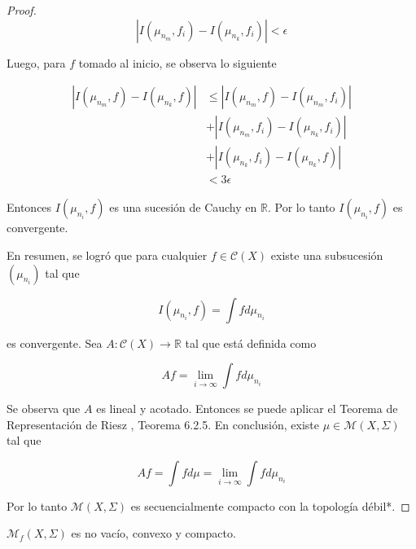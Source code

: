 \begin{proof}
	\begin{equation}
		|I(\mu_{n_m},f_i) - I(\mu_{n_k},f_i)| < \epsilon
	\end{equation}
	
	Luego, para $f$ tomado al inicio, se observa lo siguiente
	
	\begin{align}
		|I(\mu_{n_m},f) - I(\mu_{n_k},f)| &\leq |I(\mu_{n_m},f) - I(\mu_{n_m},f_i) | \\
		& + |I(\mu_{n_m},f_i) - I(\mu_{n_k},f_i)| \\		
		& + |I(\mu_{n_k},f_i) - I(\mu_{n_k},f)|\\
		& < 3\epsilon
	\end{align}
	
	Entonces $I(\mu_{n_i},f)$ es una sucesión de Cauchy en $\mathbb{R}$. Por lo tanto $I(\mu_{n_i},f)$ es convergente.
	
	En resumen, se logró que para cualquier $f \in \mathcal{C}(X)$ existe una subsucesión $(\mu_{n_i})$ tal que
	
	\begin{equation}
		I(\mu_{n_i},f) = \int f d\mu_{n_i}
	\end{equation}
	
	es convergente. Sea $A: \mathcal{C}(X) \rightarrow \mathbb{R}$ tal que está definida como
	
	\begin{equation}
		Af = \lim_{i \rightarrow \infty} \int f d \mu_{n_i}
	\end{equation}
	
	Se observa que $A$ es lineal y acotado. Entonces se puede aplicar el Teorema de Representación de Riesz \cite{riesz}, Teorema 6.2.5. En conclusión, existe \mbox{$\mu \in \mathcal{M}(X,\Sigma)$} tal que
	
	\begin{equation}
		Af = \int f d\mu = \lim_{i \rightarrow \infty} \int f d \mu_{n_i}
	\end{equation}
	
	Por lo tanto $\mathcal{M}(X,\Sigma)$ es secuencialmente compacto con la topología débil*.
\end{proof}

\begin{teorema}\label{krylov-bugoliubov}
	$\mathcal{M}_f(X,\Sigma)$ es no vacío, convexo y compacto.
\end{teorema}

